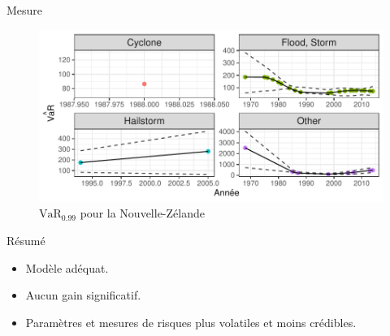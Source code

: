 \begin{frame}{Mesure }
\begin{figure}
\includegraphics[width=.75\textwidth]{images/fig-032.pdf}
\caption{$\widehat{\text{VaR}_{0.99}}$ pour la Nouvelle-Zélande}
\end{figure}
\end{frame}


\begin{frame}{Résumé}
\begin{itemize}
\item Modèle adéquat. 
\item Aucun gain significatif. 
\item Paramètres et mesures de risques plus volatiles et moins crédibles. 
\end{itemize}
\end{frame}

